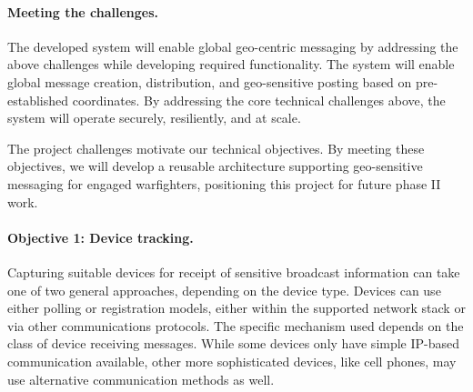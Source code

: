 \documentclass{sbir}
\begin{document}
%

\paragraph{Meeting the challenges.}  The developed system will enable global geo-centric messaging by addressing the above challenges while developing required functionality.  The system will enable global message creation, distribution, and geo-sensitive posting based on pre-established coordinates.  By addressing the core technical challenges above, the system will operate securely, resiliently, and at scale.

{The project challenges motivate our technical objectives.  By meeting these objectives, we will develop a reusable architecture supporting geo-sensitive messaging for engaged warfighters, positioning this project for future phase II work.}

\paragraph{Objective 1: Device tracking.} Capturing suitable devices for receipt of sensitive broadcast information can take one of two general approaches, depending on the device type.  Devices can use either polling or registration models, either within the supported network stack or via other communications protocols.  The specific mechanism used depends on the class of device receiving messages.  While some devices only have simple IP-based communication available, other more sophisticated devices, like cell phones, may use alternative communication methods as well.
\end{document}
